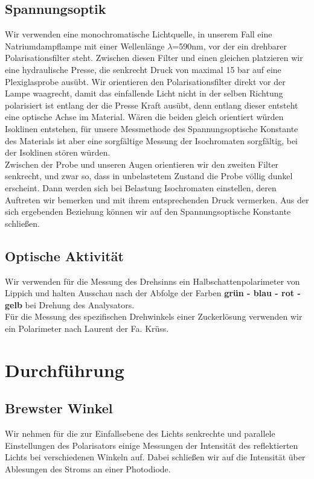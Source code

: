\documentclass[twoside]{article}
\begin{document}
\subsection{Spannungsoptik}

Wir verwenden eine monochromatische Lichtquelle, in unserem Fall eine Natriumdampflampe mit einer Wellenlänge $\lambda$=590nm, vor der ein drehbarer Polarisationsfilter steht. Zwischen diesen Filter und einen gleichen platzieren wir eine hydraulische Presse, die senkrecht Druck von maximal 15 bar auf eine Plexiglasprobe ausübt. Wir orientieren den Polarisationsfilter direkt vor der Lampe waagrecht, damit das einfallende Licht nicht in der selben Richtung polarisiert ist entlang der die Presse Kraft ausübt, denn entlang dieser entsteht eine optische Achse im Material. Wären die beiden gleich orientiert würden Isoklinen entstehen, für unsere Messmethode des Spannungsoptische Konstante des Materials ist aber eine sorgfältige Messung der Isochromaten sorgfältig, bei der Isoklinen stören würden. \\
Zwischen der Probe und unseren Augen orientieren wir den zweiten Filter senkrecht, und zwar so, dass in unbelastetem Zustand die Probe völlig dunkel erscheint. Dann werden sich bei Belastung Isochromaten einstellen, deren Auftreten wir bemerken und mit ihrem entsprechenden Druck vermerken. Aus der sich ergebenden Beziehung können wir auf den Spannungsoptische Konstante schließen.

\subsection{Optische Aktivität}
Wir verwenden für die Messung des Drehsinns ein Halbschattenpolarimeter von Lippich und halten Ausschau nach der Abfolge der Farben \textbf{grün - blau - rot - gelb} bei Drehung des Analysators.\\
Für die Messung des spezifischen Drehwinkels einer Zuckerlösung verwenden wir ein Polarimeter nach Laurent der Fa. Krüss.
\section{Durchführung}
\subsection{Brewster Winkel}
Wir nehmen für die zur Einfallsebene des Lichts senkrechte und parallele Einstellungen des Polarisators einige Messungen der Intensität des reflektierten Lichts bei verschiedenen Winkeln auf. Dabei schließen wir auf die Intensität über Ablesungen des Stroms an einer Photodiode.
\end{document}
